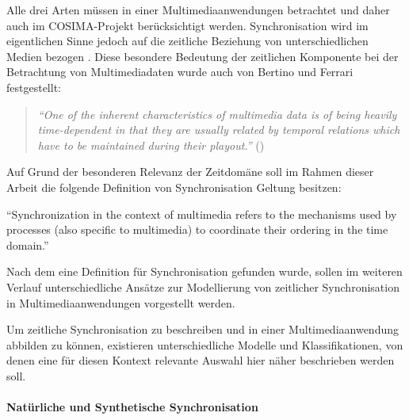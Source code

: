   Alle drei Arten müssen in einer Multimediaanwendungen betrachtet und daher auch im COSIMA-Projekt berücksichtigt werden. Synchronisation wird im eigentlichen Sinne jedoch auf die zeitliche Beziehung von unterschiedlichen Medien bezogen \citep[S. 572]{steinmetz1995mcc}. Diese besondere Bedeutung der zeitlichen Komponente bei der Betrachtung von Multimediadaten wurde auch von Bertino und Ferrari festgestellt:

  \begin{quote}
    \emph{"`One of the inherent characteristics of multimedia data is of being heavily time-dependent in that they are usually related by temporal relations which have to be maintained during their playout."'} (\citep[S. 612]{bertino1998tsm})
  \end{quote}
  
   Auf Grund der besonderen Relevanz der Zeitdomäne soll im Rahmen dieser Arbeit die folgende Definition von Synchronisation Geltung besitzen: 
  
  \begin{definition}[Synchronisation]\label{def:synchronisation}
    "`Synchronization in the context of multimedia refers to the mechanisms used by processes (also specific to multimedia) to coordinate their ordering in the time domain."' \emph{\citep[S. 401]{steinmetz1990spm}}
  \end{definition}
  
  Nach dem eine Definition für Synchronisation gefunden wurde, sollen im weiteren Verlauf unterschiedliche Ansätze zur Modellierung von zeitlicher Synchronisation in Multimediaanwendungen vorgestellt werden.
  
\label{msec:modelle_zur_beschreibung_zeitlicher_synchronisation}

  Um zeitliche Synchronisation zu beschreiben und in einer Multimediaanwendung abbilden zu können, existieren unterschiedliche Modelle und Klassifikationen, von denen eine für diesen Kontext relevante Auswahl hier näher beschrieben werden soll.
  
\paragraph{Natürliche und Synthetische Synchronisation} %
\label{par:natuerliche_und_synthetische_synchronisation}

